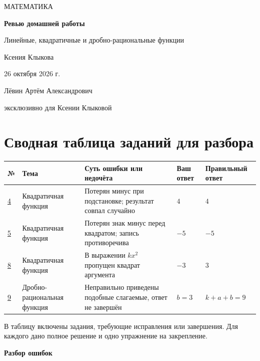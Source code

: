 \documentclass[a4paper,12pt]{article}
\begin{document}
\thispagestyle{empty}
\begin{center}
\vspace*{33mm}
{\Large\color{darkink}МАТЕМАТИКА}\par\vspace{18mm}
{\Huge\bfseries\color{accent}Ревью домашней работы}\par\vspace{9mm}
{\Large Линейные, квадратичные и дробно-рациональные функции}\par\vspace{18mm}
{\Large Ксения Клыкова}\par\vspace{15mm}
{\large 26 октября 2026 г.}\par\vfill
{\normalsize Лёвин Артём Александрович}\par\vspace{2mm}
{\small эксклюзивно для Ксении Клыковой}\par\vspace{17mm}
\end{center}
\clearpage
\section*{Сводная таблица заданий для разбора}
\small
\renewcommand{\arraystretch}{1.45}
\begin{tabularx}{\linewidth}{@{}>{\centering\arraybackslash}p{10mm}p{26mm}X p{23mm}p{23mm}@{}}
\toprule
\textbf{№}&\textbf{Тема}&\textbf{Суть ошибки или недочёта}&\textbf{Ваш ответ}&\textbf{Правильный ответ}\\
\midrule
\hyperref[task:4]{4}&Квадратичная функция&Потерян минус при подстановке; результат совпал случайно&$4$&$4$\\
\hyperref[task:5]{5}&Квадратичная функция&Потерян знак минус перед квадратом; запись противоречива&$-5$&$-5$\\
\hyperref[task:8]{8}&Квадратичная функция&В выражении $kx^2$ пропущен квадрат аргумента&$-3$&$3$\\
\hyperref[task:9]{9}&Дробно-рациональная функция&Неправильно приведены подобные слагаемые, ответ не завершён&$b=3$&$k+a+b=9$\\
\bottomrule
\end{tabularx}
\par\normalsize
\vspace{7mm}
\noindent В таблицу включены задания, требующие исправления или завершения. Для каждого дано полное решение и одно упражнение на закрепление.
\clearpage
\thispagestyle{empty}
\vspace*{\fill}
\begin{center}
{\LARGE\bfseries\color{accent}Разбор ошибок}
\end{center}
\vspace*{\fill}
\end{document}
